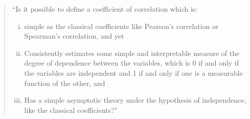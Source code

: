 \documentclass[10pt]{amsart}
\begin{document}
\begin{quote}
``Is it possible to define a coefficient of correlation which is:
\begin{enumerate}[(i)]
\item simple as the classical coefficients like Pearson's correlation or Spearman's correlation, and yet
\item  Consistently estimates some simple and interpretable measure of the degree of dependence between the variables, which is 0 if and only if the variables are independent and 1 if and only if one is a measurable function of the other, and
\item  Has a simple asymptotic theory under the hypothesis of independence, like the classical coefficients?"
\end{enumerate}
\end{quote}
\end{document}
